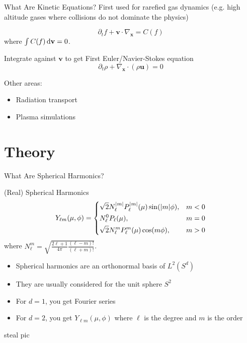 \documentclass{beamer}
\renewcommand{\vec}[1]{\ensuremath{\mathbf{#1}}}
\begin{document}
    \begin{frame}{What Are Kinetic Equations?}
        First used for rarefied gas dynamics (e.g. high altitude gases where collisions do not dominate the physics)

        \[\partial_t f + \vec{v} \cdot \nabla_\vec{x} = C(f)\]
        where $\int C(f) \dif \vec{v} = 0$.

        \vfill

        Integrate against \vec{v} to get First Euler/Navier-Stokes equation
        \[\partial_t \rho + \nabla_{\vec{x}} \cdot (\rho \vec{u}) = 0\]

        \vfill

        Other areas:
        \begin{itemize}
            \item Radiation transport
            \item Plasma simulations
        \end{itemize}
    \end{frame}

\section{Theory}

    \begin{frame}{What Are Spherical Harmonics?}
        \begin{block}{(Real) Spherical Harmonics}
            \begin{equation*}
                Y_{\ell m}(\mu,\phi) =
                \begin{dcases}
                    \sqrt{2} N_\ell^{|m|} P_\ell^{|m|}(\mu) \sin(|m|\phi), & m < 0 \\
                    N_\ell^0 P_\ell(\mu), & m = 0 \\
                    \sqrt{2} N_\ell^m P_\ell^m(\mu) \cos(m\phi), & m > 0
                \end{dcases}
            \end{equation*}
            where $N_\ell^m = \sqrt{\frac{2\ell + 1}{4\pi}\frac{(\ell - m)!}{(\ell + m)!}}$.
            \begin{itemize}
                \item Spherical harmonics are an orthonormal basis of $L^2(S^d)$
                \item They are usually considered for the unit sphere $S^2$
                \item For $d = 1$, you get Fourier series
                \item For $d = 2$, you get $Y_{\ell m}(\mu,\phi)$ where $\ell$ is the degree and $m$ is the order
            \end{itemize}
        \end{block}
        \alert{steal pic}
    \end{frame}
\end{document}
